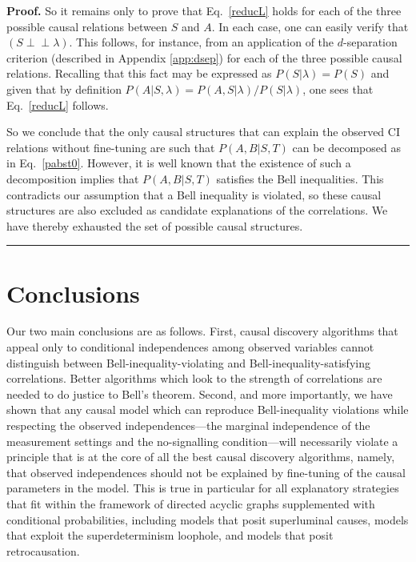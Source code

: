 \documentclass[12pt,onecolumn,nofootinbib]{revtex4-2}
\newenvironment{proof}[1][Proof]{\noindent\textbf{#1.} }{\ \rule{0.5em}{0.5em}}
\def\indep{\perp\!\!\!\!\perp}
\begin{document}
\begin{proof}
So it remains only to prove that Eq.~\eqref{reducL} holds for each of the three possible causal relations between $S$ and $A$.  In each case, one can easily verify that $\left(S \indep \lambda\right)$.  This follows, for instance, from an application of the $d$-separation criterion (described in Appendix \ref{app:dsep}) for each of the three possible causal relations.  Recalling that this fact may be expressed as $P(S|\lambda)=P(S)$ and given that by definition $P(A|S,\lambda)= P(A,S| \lambda)/ P(S|\lambda)$, one sees that Eq.~\eqref{reducL} follows.

So we conclude that the only causal structures that can explain the observed CI relations without fine-tuning are such that $P(A,B|S,T)$ can be decomposed as in Eq.~\eqref{pabst0}.  However, it is well known that the existence of such a decomposition implies that $P(A,B|S,T)$ satisfies the Bell inequalities.  This contradicts our assumption that a Bell inequality is violated, so these causal structures are also excluded as candidate explanations of the correlations.  We have thereby exhausted the set of possible causal structures.
\end{proof}




\section{Conclusions}
\label{sec:conc}

Our two main conclusions are as follows. First, causal discovery
algorithms that appeal only to conditional independences among observed
variables cannot distinguish between Bell-inequality-violating and
Bell-inequality-satisfying correlations. Better algorithms which look to the
strength of correlations are needed to do justice to Bell's theorem.  Second, and more importantly, we have shown that any causal model which can reproduce Bell-inequality violations while respecting the observed independences---the marginal independence of the measurement settings and the no-signalling condition---will necessarily violate a principle that is at the core of all the best causal discovery algorithms, namely, that observed independences should not be explained by fine-tuning of the causal parameters in the model.  This is true in particular for all explanatory strategies that fit within the framework of directed acyclic graphs supplemented with conditional probabilities, including models that posit superluminal causes, models that exploit the superdeterminism loophole, and models that posit retrocausation.
\end{document}
